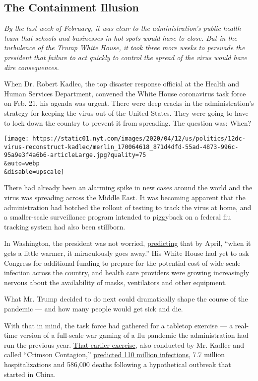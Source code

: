 \hypertarget{the-containment-illusion}{%
\subsection{The Containment Illusion}\label{the-containment-illusion}}

\emph{By the last week of February, it was clear to the administration's
public health team that schools and businesses in hot spots would have
to close. But in the turbulence of the Trump White House, it took three
more weeks to persuade the president that failure to act quickly to
control the spread of the virus would have dire consequences.}

When Dr. Robert Kadlec, the top disaster response official at the Health
and Human Services Department, convened the White House coronavirus task
force on Feb. 21, his agenda was urgent. There were deep cracks in the
administration's strategy for keeping the virus out of the United
States. They were going to have to lock down the country to prevent it
from spreading. The question was: When?

\texttt{[image: https://static01.nyt.com/images/2020/04/12/us/politics/12dc-virus-reconstruct-kadlec/merlin\_170064618\_871d4dfd-55ad-4873-996c-95a9e3f4a6b6-articleLarge.jpg?quality=75\\\&auto=webp\\\&disable=upscale]}

There had already been an
\href{https://www.nytimes.com/2020/02/21/world/asia/china-coronavirus-iran.html}{alarming
spike in new cases} around the world and the virus was spreading across
the Middle East. It was becoming apparent that the administration had
botched the rollout of testing to track the virus at home, and a
smaller-scale surveillance program intended to piggyback on a federal
flu tracking system had also been stillborn.

In Washington, the president was not worried,
\href{https://factba.se/transcript/donald-trump-speech-kag-rally-manchester-new-hampshire-february-10-2020}{predicting}
that by April, ``when it gets a little warmer, it miraculously goes
away.'' His White House had yet to ask Congress for additional funding
to prepare for the potential cost of wide-scale infection across the
country, and health care providers were growing increasingly nervous
about the availability of masks, ventilators and other equipment.

What Mr. Trump decided to do next could dramatically shape the course of
the pandemic --- and how many people would get sick and die.

With that in mind, the task force had gathered for a tabletop exercise
--- a real-time version of a full-scale war gaming of a flu pandemic the
administration had run the previous year.
\href{https://www.nytimes.com/2020/03/19/us/politics/trump-coronavirus-outbreak.html}{That
earlier exercise}, also conducted by Mr. Kadlec and called ``Crimson
Contagion,''
\href{https://int.nyt.com/data/documenthelper/6824-2019-10-key-findings-and-after/05bd797500ea55be0724/optimized/full.pdf\#page=18}{predicted
110 million infections}, 7.7 million hospitalizations and 586,000 deaths
following a hypothetical outbreak that started in China.

